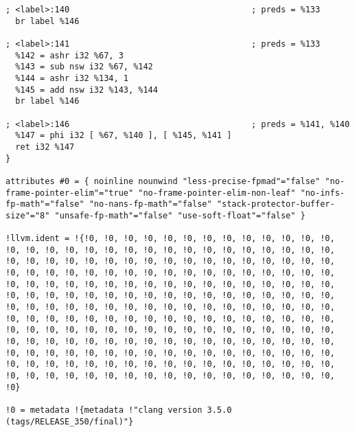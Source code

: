 \begin{lstlisting}[caption={Intermediate Representation from LLVM.}, label={lst:llvmir}]
; <label>:140                                     ; preds = %133
  br label %146

; <label>:141                                     ; preds = %133
  %142 = ashr i32 %67, 3
  %143 = sub nsw i32 %67, %142
  %144 = ashr i32 %134, 1
  %145 = add nsw i32 %143, %144
  br label %146

; <label>:146                                     ; preds = %141, %140
  %147 = phi i32 [ %67, %140 ], [ %145, %141 ]
  ret i32 %147
}

attributes #0 = { noinline nounwind "less-precise-fpmad"="false" "no-frame-pointer-elim"="true" "no-frame-pointer-elim-non-leaf" "no-infs-fp-math"="false" "no-nans-fp-math"="false" "stack-protector-buffer-size"="8" "unsafe-fp-math"="false" "use-soft-float"="false" }

!llvm.ident = !{!0, !0, !0, !0, !0, !0, !0, !0, !0, !0, !0, !0, !0, !0, !0, !0, !0, !0, !0, !0, !0, !0, !0, !0, !0, !0, !0, !0, !0, !0, !0, !0, !0, !0, !0, !0, !0, !0, !0, !0, !0, !0, !0, !0, !0, !0, !0, !0, !0, !0, !0, !0, !0, !0, !0, !0, !0, !0, !0, !0, !0, !0, !0, !0, !0, !0, !0, !0, !0, !0, !0, !0, !0, !0, !0, !0, !0, !0, !0, !0, !0, !0, !0, !0, !0, !0, !0, !0, !0, !0, !0, !0, !0, !0, !0, !0, !0, !0, !0, !0, !0, !0, !0, !0, !0, !0, !0, !0, !0, !0, !0, !0, !0, !0, !0, !0, !0, !0, !0, !0, !0, !0, !0, !0, !0, !0, !0, !0, !0, !0, !0, !0, !0, !0, !0, !0, !0, !0, !0, !0, !0, !0, !0, !0, !0, !0, !0, !0, !0, !0, !0, !0, !0, !0, !0, !0, !0, !0, !0, !0, !0, !0, !0, !0, !0, !0, !0, !0, !0, !0, !0, !0, !0, !0, !0, !0, !0, !0, !0, !0, !0, !0, !0, !0, !0, !0, !0, !0, !0, !0, !0, !0, !0, !0, !0, !0, !0, !0, !0, !0, !0, !0, !0, !0, !0, !0, !0, !0, !0, !0, !0, !0, !0, !0, !0, !0, !0, !0}

!0 = metadata !{metadata !"clang version 3.5.0 (tags/RELEASE_350/final)"}

\end{lstlisting}